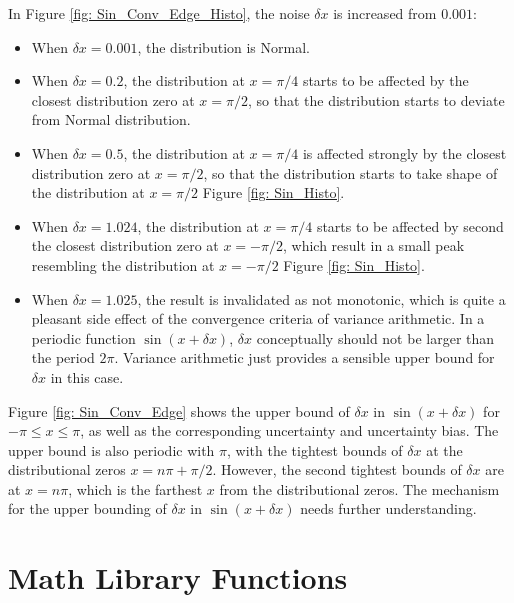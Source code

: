 \documentclass[twoside]{article}
\numberwithin{equation}{section}
\begin{document}
In Figure \ref{fig: Sin_Conv_Edge_Histo}, the noise $\delta x$ is increased from $0.001$:
\begin{itemize}
\item When $\delta x = 0.001$, the distribution is Normal.

\item When $\delta x=0.2$, the distribution at $x = \pi/4$ starts to be affected by the closest distribution zero at $x = \pi/2$, so that the distribution starts to deviate from Normal distribution.

\item When $\delta x = 0.5$, the distribution at $x = \pi/4$ is affected strongly by the closest distribution zero at $x = \pi/2$, so that the distribution starts to take shape of the distribution at $x = \pi/2$ Figure \ref{fig: Sin_Histo}. 

\item When $\delta x = 1.024$, the distribution at $x = \pi/4$ starts to be affected by second the closest distribution zero at $x = -\pi/2$, which result in a small peak resembling the distribution at $x = -\pi/2$ Figure \ref{fig: Sin_Histo}.

\item When $\delta x = 1.025$, the result is invalidated as not monotonic, which is quite a pleasant side effect of the convergence criteria of variance arithmetic.
In a periodic function $\sin(x + \delta x)$, $\delta x$ conceptually should not be larger than the period $2\pi$.
Variance arithmetic just provides a sensible upper bound for $\delta x$ in this case.

\end{itemize}

Figure \ref{fig: Sin_Conv_Edge} shows the upper bound of $\delta x$ in $\sin(x + \delta x)$ for $-\pi \leq x \leq \pi$, as well as the corresponding uncertainty and uncertainty bias.
The upper bound is also periodic with $\pi$, with the tightest bounds of $\delta x$ at the distributional zeros $x=n\pi +\pi/2$.
However, the second tightest bounds of $\delta x$ are at $x=n\pi$, which is the farthest $x$ from the distributional zeros.
The mechanism for the upper bounding of $\delta x$ in $\sin(x + \delta x)$ needs further understanding.







\clearpage
\section{Math Library Functions}
\label{sec: Math Library}
\end{document}
